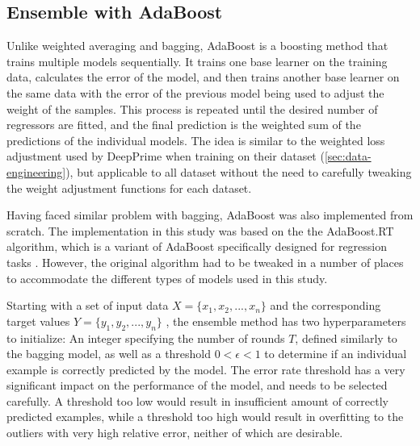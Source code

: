 \subsection{Ensemble with AdaBoost}
\label{sec:ensemble-adaboost}

Unlike weighted averaging and bagging, AdaBoost is a boosting method that trains multiple models sequentially. It trains one base learner on the training data, calculates the error of the model, and then trains another base learner on the same data with the error of the previous model being used to adjust the weight of the samples. This process is repeated until the desired number of regressors are fitted, and the final prediction is the weighted sum of the predictions of the individual models. The idea is similar to the weighted loss adjustment used by DeepPrime when training on their dataset (\autoref{sec:data-engineering}), but applicable to all dataset without the need to carefully tweaking the weight adjustment functions for each dataset.

Having faced similar problem with bagging, AdaBoost was also implemented from scratch. The implementation in this study was based on the the AdaBoost.RT algorithm, which is a variant of AdaBoost specifically designed for regression tasks \cite{shresthaExperimentsAdaBoostRT2006,solomatineAdaBoostRTBoosting2004}. However, the original algorithm had to be tweaked in a number of places to accommodate the different types of models used in this study. 

Starting with a set of input data $X=\{x_1, x_2, ..., x_n\}$ and the corresponding target values $Y=\{y_1, y_2, ..., y_n\}$
, the ensemble method has two hyperparameters to initialize: An integer specifying the number of rounds $T$, defined similarly to the bagging model, as well as a threshold $0<\epsilon < 1$ to determine if an individual example is correctly predicted by the model.
The error rate threshold has a very significant impact on the performance of the model, and needs to be selected carefully. A threshold too low would result in insufficient amount of correctly predicted examples, while a threshold too high would result in overfitting to the outliers with very high relative error, neither of which are desirable\cite{shresthaExperimentsAdaBoostRT2006}. 

